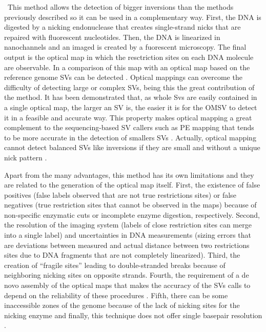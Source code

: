 \documentclass{article}
\begin{document}
\begin{itemize}
\
This method allows the detection of bigger inversions than the methods previously described so it can be used in a complementary way. First, the DNA is digested by a nicking endonuclease that creates single-strand nicks that are repaired with fluorescent nucleotides. Then, the DNA is linearized in nanochannels and an imaged is created by a fuorescent microscopy. The final output is the optical map in which the resctriction sites on each DNA molecule are observable. In a comparison of this map with an optical map based on the reference genome SVs can be detected \cite{besenbacher_novel_2015, chin_phased_2016}.
Optical mappings can overcome the difficulty of detecting large or complex SVs, being this the great contribution of the method. It has been demonstrated that, as whole Svs are easily contained in a single optical map, the larger an SV  is, the easier it is for the OMSV to detect it in a feasible and accurate way. This property makes optical mapping a great complement to the sequencing-based SV callers such as PE mapping that tends to be more accurate in the detection of smallers SVs \cite{li_omsv_2017}. Actually, optical mapping cannot detect balanced SVs like inversions if they are small and without a unique nick pattern \cite{mak_genome-wide_2016}.
\

Apart from the many advantages, this method has its own limitations and they are related to the generation of the optical map itself. First, the existence of false positives (false labels observed that are not true restrictions sites) or false negatives (true restriction sites that cannot be observed in the maps) because of non-specific enzymatic cuts or incomplete enzyme digestion, respectively. Second, the resolution of the imaging system (labels of close restriction sites can merge into a single label) and uncertainties in DNA measurements (sizing errors that are deviations between measured and actual distance between two restrictions sites due to DNA fragments that are not completely linearized). Third, the creation of “fragile sites” leading to double-stranded breaks because of neighboring nicking sites on opposite strands. Fourth, the requirement of a de novo assembly of the optical maps that makes the accuracy of the SVs calls to depend on the reliability of these procedures \cite{li_omsv_2017, mak_genome-wide_2016}. Fifth, there can be some inaccessible zones of the genome because of the lack of nicking sites for the nicking enzyme and finally, this technique does not offer single basepair resolution \cite{levy-sakin_genome_2019}.


\end{itemize}
\end{document}

